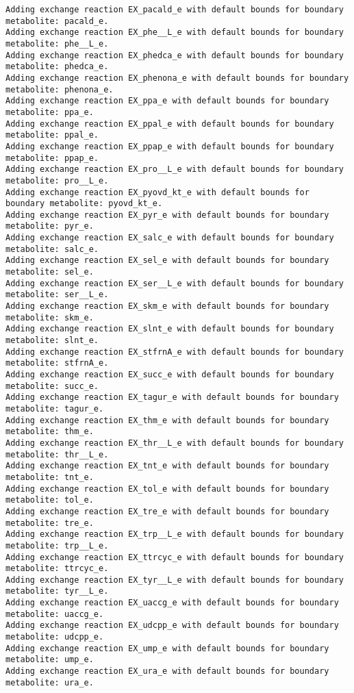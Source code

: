 \documentclass[
  letterpaper,
  DIV=11,
  numbers=noendperiod]{scrartcl}
\begin{document}
\begin{verbatim}
Adding exchange reaction EX_pacald_e with default bounds for boundary metabolite: pacald_e.
Adding exchange reaction EX_phe__L_e with default bounds for boundary metabolite: phe__L_e.
Adding exchange reaction EX_phedca_e with default bounds for boundary metabolite: phedca_e.
Adding exchange reaction EX_phenona_e with default bounds for boundary metabolite: phenona_e.
Adding exchange reaction EX_ppa_e with default bounds for boundary metabolite: ppa_e.
Adding exchange reaction EX_ppal_e with default bounds for boundary metabolite: ppal_e.
Adding exchange reaction EX_ppap_e with default bounds for boundary metabolite: ppap_e.
Adding exchange reaction EX_pro__L_e with default bounds for boundary metabolite: pro__L_e.
Adding exchange reaction EX_pyovd_kt_e with default bounds for boundary metabolite: pyovd_kt_e.
Adding exchange reaction EX_pyr_e with default bounds for boundary metabolite: pyr_e.
Adding exchange reaction EX_salc_e with default bounds for boundary metabolite: salc_e.
Adding exchange reaction EX_sel_e with default bounds for boundary metabolite: sel_e.
Adding exchange reaction EX_ser__L_e with default bounds for boundary metabolite: ser__L_e.
Adding exchange reaction EX_skm_e with default bounds for boundary metabolite: skm_e.
Adding exchange reaction EX_slnt_e with default bounds for boundary metabolite: slnt_e.
Adding exchange reaction EX_stfrnA_e with default bounds for boundary metabolite: stfrnA_e.
Adding exchange reaction EX_succ_e with default bounds for boundary metabolite: succ_e.
Adding exchange reaction EX_tagur_e with default bounds for boundary metabolite: tagur_e.
Adding exchange reaction EX_thm_e with default bounds for boundary metabolite: thm_e.
Adding exchange reaction EX_thr__L_e with default bounds for boundary metabolite: thr__L_e.
Adding exchange reaction EX_tnt_e with default bounds for boundary metabolite: tnt_e.
Adding exchange reaction EX_tol_e with default bounds for boundary metabolite: tol_e.
Adding exchange reaction EX_tre_e with default bounds for boundary metabolite: tre_e.
Adding exchange reaction EX_trp__L_e with default bounds for boundary metabolite: trp__L_e.
Adding exchange reaction EX_ttrcyc_e with default bounds for boundary metabolite: ttrcyc_e.
Adding exchange reaction EX_tyr__L_e with default bounds for boundary metabolite: tyr__L_e.
Adding exchange reaction EX_uaccg_e with default bounds for boundary metabolite: uaccg_e.
Adding exchange reaction EX_udcpp_e with default bounds for boundary metabolite: udcpp_e.
Adding exchange reaction EX_ump_e with default bounds for boundary metabolite: ump_e.
Adding exchange reaction EX_ura_e with default bounds for boundary metabolite: ura_e.

\end{verbatim}
\end{document}
